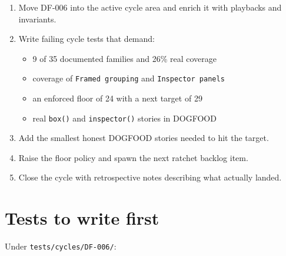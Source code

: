 \begin{enumerate}
\def\labelenumi{\arabic{enumi}.}
\tightlist
\item
  Move DF-006 into the active cycle area and enrich it with playbacks and invariants.
\item
  Write failing cycle tests that demand:

  \begin{itemize}
  \tightlist
  \item
    9 of 35 documented families and 26\% real coverage
  \item
    coverage of \texttt{F\allowbreak{}r\allowbreak{}a\allowbreak{}m\allowbreak{}e\allowbreak{}d\allowbreak{} \allowbreak{}g\allowbreak{}r\allowbreak{}o\allowbreak{}u\allowbreak{}p\allowbreak{}i\allowbreak{}n\allowbreak{}g} and \texttt{I\allowbreak{}n\allowbreak{}s\allowbreak{}p\allowbreak{}e\allowbreak{}c\allowbreak{}t\allowbreak{}o\allowbreak{}r\allowbreak{} \allowbreak{}p\allowbreak{}a\allowbreak{}n\allowbreak{}e\allowbreak{}l\allowbreak{}s}
  \item
    an enforced floor of 24 with a next target of 29
  \item
    real \texttt{b\allowbreak{}o\allowbreak{}x\allowbreak{}(\allowbreak{})} and \texttt{i\allowbreak{}n\allowbreak{}s\allowbreak{}p\allowbreak{}e\allowbreak{}c\allowbreak{}t\allowbreak{}o\allowbreak{}r\allowbreak{}(\allowbreak{})} stories in DOGFOOD
  \end{itemize}
\item
  Add the smallest honest DOGFOOD stories needed to hit the target.
\item
  Raise the floor policy and spawn the next ratchet backlog item.
\item
  Close the cycle with retrospective notes describing what actually landed.
\end{enumerate}

\section{Tests to write first}\label{record-068-tests-to-write-first}

Under \texttt{t\allowbreak{}e\allowbreak{}s\allowbreak{}t\allowbreak{}s\allowbreak{}/\allowbreak{}c\allowbreak{}y\allowbreak{}c\allowbreak{}l\allowbreak{}e\allowbreak{}s\allowbreak{}/\allowbreak{}D\allowbreak{}F\allowbreak{}-\allowbreak{}0\allowbreak{}0\allowbreak{}6\allowbreak{}/}:


